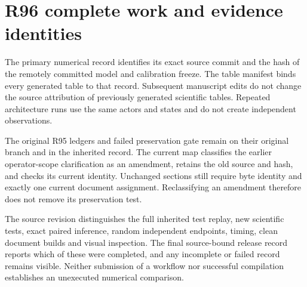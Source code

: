\section{R96 complete work and evidence identities}\label{sec:evidence96}
The primary numerical record identifies its exact source commit and the hash of the remotely committed model and calibration freeze. The table manifest binds every generated table to that record. Subsequent manuscript edits do not change the source attribution of previously generated scientific tables. Repeated architecture runs use the same actors and states and do not create independent observations.

The original R95 ledgers and failed preservation gate remain on their original branch and in the inherited record. The current map classifies the earlier operator-scope clarification as an amendment, retains the old source and hash, and checks its current identity. Unchanged sections still require byte identity and exactly one current document assignment. Reclassifying an amendment therefore does not remove its preservation test.

The source revision distinguishes the full inherited test replay, new scientific tests, exact paired inference, random independent endpoints, timing, clean document builds and visual inspection. The final source-bound release record reports which of these were completed, and any incomplete or failed record remains visible. Neither submission of a workflow nor successful compilation establishes an unexecuted numerical comparison.
